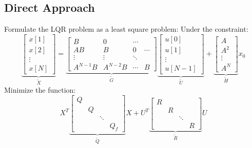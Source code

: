 \documentclass[10pt,a4paper,oneside]{article}
\begin{document}
\subsection{Direct Approach}
Formulate the LQR problem as a least square problem:
Under the constraint:
$$
\underbrace{\left[\begin{array}{c}{x[1]} \\ {x[2]} \\ {\vdots} \\ {x[N]}\end{array}\right]}_{\widetilde{X}}=\underbrace{\left[\begin{array}{cccc}{B} & {0} & {\cdots} & {} \\ {A B} & {B} & {0} & {\cdots} \\ {\vdots} & {\vdots} & {\ddots} & {} \\ {A^{N-1} B} & {A^{N-2} B} & {\cdots} & {B}\end{array}\right]}_{\widetilde{G}}\underbrace{\left[\begin{array}{c}{u[0]} \\ {u[1]} \\ {\vdots} \\ {u[N-1]}\end{array}\right]}_{\widetilde{U}}+\underbrace{\left[\begin{array}{c}{A} \\ {A^{2}} \\ {\vdots} \\ {A^{N}}\end{array}\right]}_{\widetilde{H}} x_{0}
		$$
Minimize the function:
\[
X^T\underbrace{\left[\begin{array}{cccc}{Q} & {} & {} & {} \\ {} & {Q} & {} & {} \\ {} & {} & {\ddots} & {} \\ {} & {} & {} & {Q_f}\end{array}\right]}_{\widetilde{Q}}X+U^T\underbrace{\left[\begin{array}{cccc}{R} & {} & {} & {} \\ {} & {R} & {} & {} \\ {} & {} & {\ddots} & {} \\ {} & {} & {} & {R}\end{array}\right]}_{\widetilde{R}}U
\]
\end{document}
